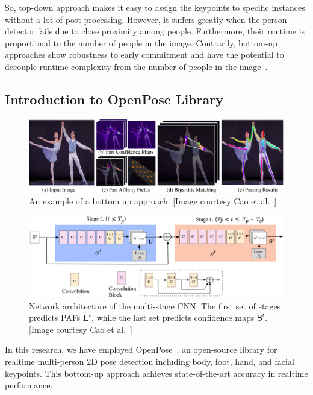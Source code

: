 So, top-down approach makes it easy to assign the keypoints to specific instances without a lot of post-processing. However, it suffers greatly when the person detector fails due to close proximity among people. Furthermore, their runtime is proportional to the number of people in the image. Contrarily, bottom-up approaches show robustness to early commitment and have the potential to decouple runtime complexity from the number of people in the image~\cite{Cao_19}.



\subsection{Introduction to OpenPose Library} 
\begin{figure}
	\centering
	\includegraphics[width=\textwidth]{figures/openpose_bottom_up.eps}
	\caption[An example of a bottom up approach]
	{An example of a bottom up approach. [Image courtesy Cao et al.~\cite{Cao_19}] \label{fig:openpose_bottom_up}}
\end{figure}

\begin{figure}
	\centering
	\includegraphics[width=\textwidth]{figures/openpose_architecture.eps}
	\caption[Network architecture of the multi-stage CNN]
	{Network architecture  of  the  multi-stage  CNN.  The  first  set of stages predicts PAFs $\textbf{L}^t$, while the last set predicts confidence  maps $ \textbf{S}^{t}$. [Image courtesy Cao et al.~\cite{Cao_19}] \label{fig:openpose_architecture}}
\end{figure}

In this research, we have employed OpenPose~\cite{Cao_19}, an open-source library for realtime multi-person 2D pose detection including body, foot, hand, and facial keypoints. This bottom-up approach achieves state-of-the-art accuracy in realtime performance. 

